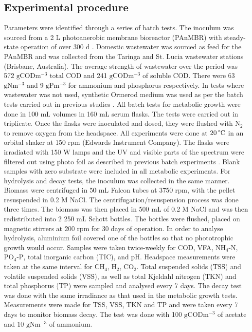 \subsection{Experimental procedure}
Parameters were identified through a series of batch tests. The inoculum was sourced from a 2 L photoanerobic membrane bioreactor (PAnMBR) with steady-state operation of over 300 d \cite{hulsen2016}. Domestic wastewater was sourced as feed for the PAnMBR and was collected from the Taringa and St. Lucia wastewater stations (Brisbane, Australia). The average strength of wastewater over the period was 572 $\mathrm{g COD m^{-3}}$ total COD and 241 $\mathrm{g COD m^{-3}}$ of soluble COD. There were 63 $\mathrm{g N m^{-3}}$ and 9 $\mathrm{g P m^{-3}}$ for ammonium and phosphorus respectively. In tests where wastewater was not used, synthetic Ormerod medium was used as per the batch tests carried out in previous studies \cite{hulsen2014}. 
\skippingparagraph
All batch tests for metabolic growth were done in 100 mL volumes in 160 mL serum flasks. The tests were carried out in triplicate. Once the flasks were inoculated and dosed, they were flushed with $\mathrm{N_2}$ to remove oxygen from the headspace. All experiments were done at $\mathrm{20 \, \degree C}$ in an orbital shaker at 150 rpm (Edwards Instrument Company). The flasks were irradiated with 150 W lamps and the UV and visible parts of the spectrum were filtered out using photo foil as described in previous batch experiments \cite{hulsen2014}. Blank samples with zero substrate were included in all metabolic experiments.
\skippingparagraph
For hydrolysis and decay tests, the inoculum was collected in the same manner. Biomass were centrifuged in 50 mL Falcon tubes at 3750 rpm, with the pellet resuspended in 0.2 M NaCl. The centrifugation/resuspension process was done three times. The biomass was then placed in 500 mL of 0.2 M NaCl and was then redistributed into 2 250 mL Schott bottles. The bottles were flushed, placed on magnetic stirrers at 200 rpm for 30 days of operation. In order to analyse hydrolysis, aluminium foil covered one of the bottles so that no phototrophic growth would occur. Samples were taken twice-weekly for COD, VFA, $\mathrm{NH_4\mbox{-}N}$, $\mathrm{PO_4\mbox{-}P}$, total inorganic carbon (TIC), and pH. Headspace measurements were taken at the same interval for $\mathrm{CH_4}$, $\mathrm{H_2}$, $\mathrm{CO_2}$. Total suspended solids (TSS) and volatile suspended solids (VSS), as well as total Kjeldahl nitrogen (TKN) and total phosphorus (TP) were sampled and analysed every 7 days. The decay test was done with the same irradiance as that used in the metabolic growth tests. Measurements were made for TSS, VSS, TKN and TP and were taken every 7 days to monitor biomass decay. The test was done with 100 $\mathrm{g COD m^{-3}}$ of acetate and 10 $\mathrm{g N m^{-3}}$ of ammonium. 
